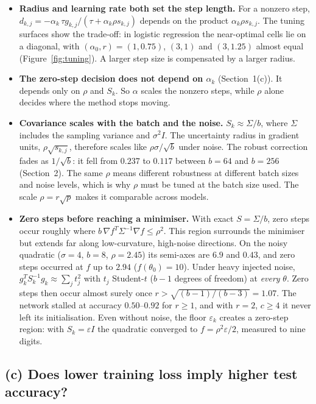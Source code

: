 \documentclass[11pt,a4paper]{article}
\begin{document}
\begin{itemize}
\item \textbf{Radius and learning rate both set the step length.} For a nonzero step,
$d_{k,j}=-\alpha_k\,\tau g_{k,j}/(\tau+\alpha_k\rho s_{k,j})$ depends on the product
$\alpha_k\rho s_{k,j}$. The tuning surfaces show the trade-off: in logistic regression the
near-optimal cells lie on a diagonal, with $(\alpha_0,r)=(1,0.75)$, $(3,1)$ and $(3,1.25)$ almost
equal (Figure~\ref{fig:tuning}). A larger step size is compensated by a larger radius.
\item \textbf{The zero-step decision does not depend on $\alpha_k$} (Section~1(c)). It depends
only on $\rho$ and $S_k$. So $\alpha$ scales the nonzero steps, while $\rho$ alone decides where
the method stops moving.
\item \textbf{Covariance scales with the batch and the noise.} $S_k\approx\Sigma/b$, where $\Sigma$
includes the sampling variance and $\sigma^2I$. The uncertainty radius in gradient units,
$\rho\sqrt{s_{k,j}}$, therefore scales like $\rho\sigma/\sqrt b$ under noise. The robust correction
fades as $1/\sqrt b$: it fell from $0.237$ to $0.117$ between $b=64$ and $b=256$ (Section~2). The
same $\rho$ means different robustness at different batch sizes and noise levels, which is why
$\rho$ must be tuned at the batch size used. The scale $\rho=r\sqrt p$ makes it comparable across
models.
\item \textbf{Zero steps before reaching a minimiser.} With exact $S=\Sigma/b$, zero steps occur
roughly where $b\,\nabla f^T\Sigma^{-1}\nabla f\le\rho^2$. This region surrounds the minimiser
but extends far along low-curvature, high-noise directions. On the noisy quadratic
($\sigma=4$, $b=8$, $\rho=2.45$) its semi-axes are $6.9$ and $0.43$, and zero steps occurred at
$f$ up to $2.94$ ($f(\theta_0)=10$). Under heavy injected noise,
$g_k^TS_k^{-1}g_k\approx\sum_jt_j^2$ with $t_j$ Student-$t$ ($b-1$ degrees of freedom) at
\emph{every} $\theta$. Zero steps then occur almost surely once
$r>\sqrt{(b-1)/(b-3)}=1.07$. The network stalled at accuracy $0.50$--$0.92$ for $r\ge1$, and with
$r=2$, $c\ge4$ it never left its initialisation. Even without noise, the floor $\varepsilon_k$
creates a zero-step region: with $S_k=\varepsilon I$ the quadratic converged to
$f=\rho^2\varepsilon/2$, measured to nine digits.
\end{itemize}

\subsection{(c) Does lower training loss imply higher test accuracy?}
\end{document}
